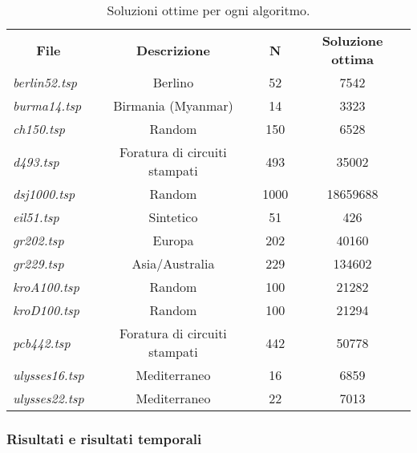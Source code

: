 \begin{table}[H]
  \centering
  \begin{tabular}{lccc}
  \multicolumn{1}{c}{\textbf{File}} & \textbf{Descrizione}          & \textbf{N} & \textbf{Soluzione ottima} \\
  \textit{berlin52.tsp}             & Berlino                       & 52         & 7542                      \\
  \textit{burma14.tsp}              & Birmania (Myanmar)            & 14         & 3323                      \\
  \textit{ch150.tsp}                & Random                        & 150        & 6528                      \\
  \textit{d493.tsp}                 & Foratura di circuiti stampati & 493        & 35002                     \\
  \textit{dsj1000.tsp}              & Random                        & 1000       & 18659688                  \\
  \textit{eil51.tsp}                & Sintetico                     & 51         & 426                       \\
  \textit{gr202.tsp}                & Europa                        & 202        & 40160                     \\
  \textit{gr229.tsp}                & Asia/Australia                & 229        & 134602                    \\
  \textit{kroA100.tsp}              & Random                        & 100        & 21282                     \\
  \textit{kroD100.tsp}              & Random                        & 100        & 21294                     \\
  \textit{pcb442.tsp}               & Foratura di circuiti stampati & 442        & 50778                     \\
  \textit{ulysses16.tsp}            & Mediterraneo                  & 16         & 6859                      \\
  \textit{ulysses22.tsp}            & Mediterraneo                  & 22         & 7013                     
  \end{tabular}
  \caption{Soluzioni ottime per ogni algoritmo.}
  \label{tab:my-table}
  \end{table}

\subsubsection{Risultati e risultati temporali}


